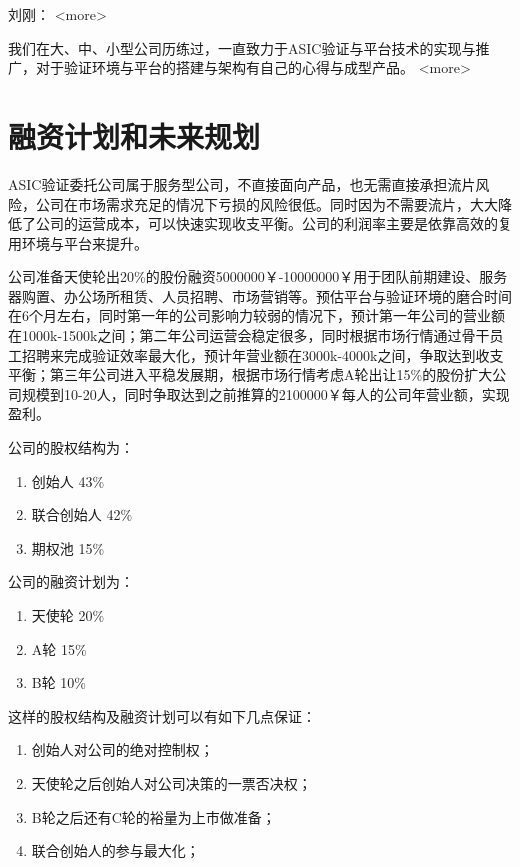 \documentclass[a4paper,11pt]{article}
\begin{document}
刘刚：
<more>

我们在大、中、小型公司历练过，一直致力于ASIC验证与平台技术的实现与推广，对于验证环境与平台的搭建与架构有自己的心得与成型产品。
<more>
\pagebreak

\section{融资计划和未来规划}
ASIC验证委托公司属于服务型公司，不直接面向产品，也无需直接承担流片风险，公司在市场需求充足的情况下亏损的风险很低。同时因为不需要流片，大大降低了公司的运营成本，可以快速实现收支平衡。公司的利润率主要是依靠高效的复用环境与平台来提升。

公司准备天使轮出20\%的股份融资5000000￥-10000000￥用于团队前期建设、服务器购置、办公场所租赁、人员招聘、市场营销等。预估平台与验证环境的磨合时间在6个月左右，同时第一年的公司影响力较弱的情况下，预计第一年公司的营业额在1000k-1500k之间；第二年公司运营会稳定很多，同时根据市场行情通过骨干员工招聘来完成验证效率最大化，预计年营业额在3000k-4000k之间，争取达到收支平衡；第三年公司进入平稳发展期，根据市场行情考虑A轮出让15\%的股份扩大公司规模到10-20人，同时争取达到之前推算的2100000￥每人的公司年营业额，实现盈利。

公司的股权结构为：
\begin{enumerate}
\item 创始人 43\%
\item 联合创始人 42\%
\item 期权池 15\%
\end{enumerate}

公司的融资计划为：
\begin{enumerate}
\item 天使轮 20\%
\item A轮 15\%
\item B轮 10\%
\end{enumerate}

这样的股权结构及融资计划可以有如下几点保证：
\begin{enumerate}
\item 创始人对公司的绝对控制权；
\item 天使轮之后创始人对公司决策的一票否决权；
\item B轮之后还有C轮的裕量为上市做准备；
\item 联合创始人的参与最大化；
\end{enumerate}
\pagebreak



\end{document}
